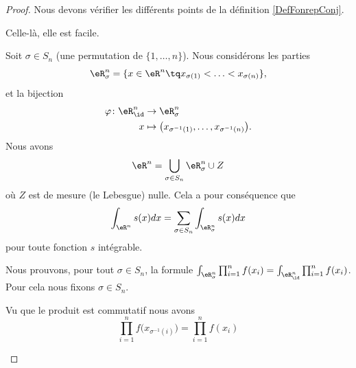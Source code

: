 \begin{proof}
	Nous devons vérifier les différents points de la définition \ref{DefFonrepConj}.
	\begin{subproof}
		\spitem[\( g\geq 0\)]
		Celle-là, elle est facile.

		Soit \( \sigma\in S_n\) (une permutation de \( \{ 1,\ldots,n \}\)). Nous considérons les parties
		\begin{equation}
			\eR^n_{\sigma}=\{ x\in \eR^n\tq x_{\sigma(1)}<\ldots <x_{\sigma(n)} \},
		\end{equation}
		et la bijection
		\begin{equation}		\label{EQooLQDGooQJNLsd}
			\begin{aligned}
				\varphi\colon \eR_{\id}^n & \to \eR^n_{\sigma}                                                 \\
				x                         & \mapsto \big( x_{\sigma^{-1}(1)},\ldots, x_{\sigma^{-1}(n)} \big).
			\end{aligned}
		\end{equation}
		Nous avons
		\begin{equation}
			\eR^n=\bigcup_{\sigma\in S_{n}}\eR^n_{\sigma}\cup Z
		\end{equation}
		où \( Z\) est de mesure (le Lebesgue) nulle. Cela a pour conséquence que
		\begin{equation}		\label{EQooIEWWooZgORTM}
			\int_{\eR^n}s(x)dx=\sum_{\sigma\in S_n}\int_{\eR^n_{\sigma}}s(x)dx
		\end{equation}
		pour toute fonction \( s\) intégrable.

		Nous prouvons, pour tout \( \sigma\in S_n\), la formule \( \int_{\eR^n_{\sigma}}\prod_{i=1}^nf(x_i)=\int_{\eR^n_{\id}}\prod_{i=1}^nf(x_i)\). Pour cela nous fixons \( \sigma\in S_n\).

		Vu que le produit est commutatif nous avons
		\begin{equation}		\label{EQooJEDAooQMmHrb}
			\prod_{i=1}^nf\big( x_{\sigma^{-1}(i)} \big)=\prod_{i=1}^nf(x_i)
		\end{equation}




\end{subproof}
\end{proof}
